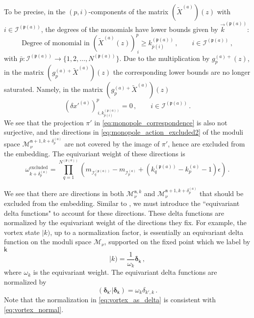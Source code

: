 \documentclass[12pt,a4paper]{article}
\newcommand{\nn}{\mathfrak{n}}
\renewcommand{\(}{\left(}
\renewcommand{\)}{\right)}
\renewcommand{\(}{\left(}
\renewcommand{\)}{\right)}
\begin{document}
\begin{itemize}
To be precise, in the $(p,i)$-components of the matrix $(\tilde{X}^{(a)})(z)$ with $i\in \mathcal{I}^{(\mathfrak{p}(a))}$, the degrees of the monomials have lower bounds given by $\vec{k}^{(\mathfrak{p}(a))}$:
\begin{equation}
\text{Degree of monomial in } (\tilde{X}^{(a)}(z))^p_{\ i}\geq k^{(\mathfrak{p}(a))}_{\bar{p}(i)}\,,\qquad i\in \mathcal{I}^{(\mathfrak{p}(a))}\,,
\end{equation}
with $\bar{p}:\mathcal{I}^{(\mathfrak{p}(a))}\to\{1,2,\dots,N^{(\mathfrak{p}(a))}\}$. 
Due to the multiplication by $g^{(a)+}_p(z)$, in the matrix $(g^{(a)+}_p\tilde{X}^{(a)})(z)$ the corresponding lower bounds are no longer saturated. 
Namely, in the matrix $(g^{(a)+}_p\tilde{X}^{(a)})(z)$
\begin{equation}\label{eq:monopole_action_excluded2}
(\delta x'^{(a)})^p_{\ i,k^{(\mathfrak{p}(a))}_{\bar{p}(i)}}=0\,,\qquad i\in \mathcal{I}^{(\mathfrak{p}(a))}\,.
\end{equation}
We see that the projection $\pi'$ in \eqref{eq:monopole_correspondence} is also not surjective, and the directions in \eqref{eq:monopole_action_excluded2} of the moduli space {\small $\mathcal{M}_\nu^{\nn+1,k+\delta^{(a)}_{p}}$} are not covered by the image of $\pi'$, hence are excluded from the embedding. 
The equivariant weight of these directions is
\begin{equation}\label{eq:excluded_weight2}
\omega^{\textrm{excluded}}_{k+\delta^{(a)}_p}=\prod_{q=1}^{N^{(\mathfrak{p}(a))}}(m_{\mathcal{I}^{(\mathfrak{p}(a))}_{q}}-m_{\mathcal{I}^{(a)}_{p}}+(k^{(\mathfrak{p}(a))}_{q}-k^{(a)}_{p}-1)\epsilon)\,.
\end{equation}
\end{itemize}

We see that there are directions in both $\mathcal{M}_\nu^{\nn,k}$ and $\mathcal{M}_\nu^{\nn+1,k+\delta^{(a)}_{p}}$ that should be excluded from the embedding. 
Similar to \cite{Bullimore:2016hdc}, we must introduce the ``equivariant delta functions" to account for these directions. 
These delta functions are normalized by the equivariant weight of the directions they fix. 
For example, the vortex state $|k)$, up to a normalization factor, is essentially an equivariant delta function on the moduli space $\mathcal{M}_\nu$, supported on the fixed point which we label by $\mathsf{k}$ 
\begin{equation}\label{eq:vortex_as_delta}
|k)=\frac{1}{\omega_k}\boldsymbol{\delta}_{\mathsf{k}}\,,
\end{equation}
where $\omega_k$ is the equivariant weight. 
The equivariant delta functions are normalized by 
\begin{equation}
(\boldsymbol{\delta}_{\mathsf{k}'}|\boldsymbol{\delta}_{\mathsf{k}})=\omega_k \delta_{k',k}\,.
\end{equation}
Note that the normalization in \eqref{eq:vortex_as_delta} is consistent with \eqref{eq:vortex_normal}.
\end{document}
